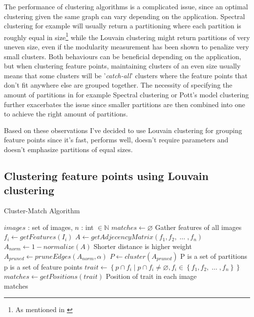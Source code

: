 \documentclass{article}
\begin{document}
The performance of clustering algorithms is a complicated issue, since 
an optimal clustering given the same graph can vary depending on the 
application. Spectral clustering for example will usually return a 
partitioning where each partition is roughly equal in size\footnote{As 
mentioned in \cite{von2007}} while the Louvain 
clustering\cite{blondel2008} might return partitions of very uneven 
size, even if the modularity measurement has been shown to penalize very 
small clusters\cite{brandes2007}. Both behaviours can be beneficial 
depending on the application, but when clustering feature points, 
maintaining clusters of an even size usually means that some clusters 
will be '\emph{catch-all}' clusters where the feature points that don't 
fit anywhere else are grouped together. The necessity of specifying the 
amount of partitions in for example Spectral clustering or Pott's model 
clustering further exacerbates the issue since smaller partitions are 
then combined into one to achieve the right amount of partitions.

Based on these observations I've decided to use Louvain clustering for 
grouping feature points since it's fast, performs well, doesn't require 
parameters and doesn't emphasize partitions of equal sizes.

\subsection{Clustering feature points using Louvain clustering}

\begin{algorithm}
\caption{Cluster-Match Algorithm}
\label{alg-simple}
\begin{algorithmic}
\Require $images$ : set of images, $n$ : int $\in \mathbb{N}$
\State $matches\gets \varnothing$
 \Comment Gather features of all images
	\State $f_i\gets getFeatures(I_i)$
\EndFor
\State $A\gets getAdjecencyMatrix(f_1, f_2,\; \ldots \;, f_n)$
\State $A_{norm}\gets 1 - normalize(A)$
\Comment Shorter distance is higher weight
\State $A_{pruned}\gets pruneEdges(A_{norm},\alpha)$
\State $P\gets cluster(A_{pruned})$ 
\Comment P is a set of partitions
 \Comment p is a set of feature points
	\State $trait\gets \left\{p \cap f_i \mid p \cap f_i \neq 
\varnothing, f_i \in \left\{f_1, f_2,\; \ldots \;, f_n\right\}\right\}$
		\State $matches\gets getPositions(trait)$
		\Comment Position of trait in each image
	\EndIf
\EndFor \\
\Return matches
\end{algorithmic}
\end{algorithm}
\end{document}
